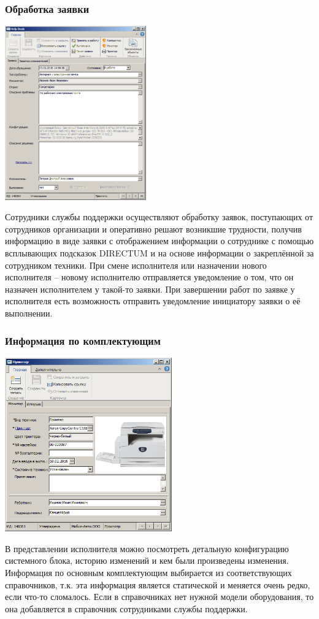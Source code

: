 \documentclass{../industrial-development}
\begin{document}
\begin{frame} \frametitle{Обработка заявки}
\centerline{\includegraphics[height=7.5cm]{pic6.png}}
\end{frame}
\lecturenotes
Сотрудники службы поддержки осуществляют обработку заявок, поступающих от сотрудников организации и оперативно решают возникшие трудности, получив информацию в виде заявки с отображением информации о сотруднике с помощью всплывающих подсказок DIRECTUM и на основе информации о закреплённой за сотрудником техники.
При смене исполнителя или назначении нового исполнителя – новому исполнителю отправляется уведомление о том, что он назначен исполнителем у такой-то заявки. При завершении работ по заявке у исполнителя есть возможность отправить уведомление инициатору заявки о её выполнении.

\begin{frame} \frametitle{Информация по комплектующим}
\centerline{\includegraphics[height=7.5cm]{pic7.png}}
\end{frame}
\lecturenotes
В представлении исполнителя можно посмотреть детальную конфигурацию системного блока, историю изменений и кем были произведены изменения. Информация по основным комплектующим выбирается из соответствующих справочников, т.к. эта информация является статической и меняется очень редко, если что-то сломалось. Если в справочниках нет нужной модели оборудования, то она добавляется в справочник сотрудниками службы поддержки.
\end{document}

